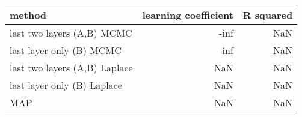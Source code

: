 \begin{tabular}{lrr}
\toprule
                        method &  learning coefficient &  R squared \\
\midrule
    last two layers (A,B) MCMC &                  -inf &        NaN \\
      last layer only (B) MCMC &                  -inf &        NaN \\
 last two layers (A,B) Laplace &                   NaN &        NaN \\
   last layer only (B) Laplace &                   NaN &        NaN \\
                           MAP &                   NaN &        NaN \\
\bottomrule
\end{tabular}
